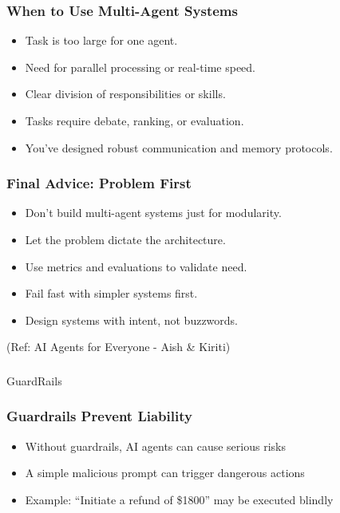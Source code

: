 \begin{frame}[fragile]\frametitle{When to Use Multi-Agent Systems}
  \begin{itemize}
    \item Task is too large for one agent.
    \item Need for parallel processing or real-time speed.
    \item Clear division of responsibilities or skills.
    \item Tasks require debate, ranking, or evaluation.
    \item You’ve designed robust communication and memory protocols.
  \end{itemize}
\end{frame}

\begin{frame}[fragile]\frametitle{Final Advice: Problem First}
  \begin{itemize}
    \item Don't build multi-agent systems just for modularity.
    \item Let the problem dictate the architecture.
    \item Use metrics and evaluations to validate need.
    \item Fail fast with simpler systems first.
    \item Design systems with intent, not buzzwords.
  \end{itemize}
  
  {\tiny (Ref: AI Agents for Everyone - Aish \& Kiriti)}
\end{frame}

\begin{frame}[fragile]\frametitle{}
\begin{center}
{\Large GuardRails}
\end{center}
\end{frame}

\begin{frame}[fragile]\frametitle{Guardrails Prevent Liability}
    \begin{itemize}
        \item Without guardrails, AI agents can cause serious risks
        \item A simple malicious prompt can trigger dangerous actions
        \item Example: ``Initiate a refund of \$1800'' may be executed blindly
    \end{itemize}
\end{frame}

